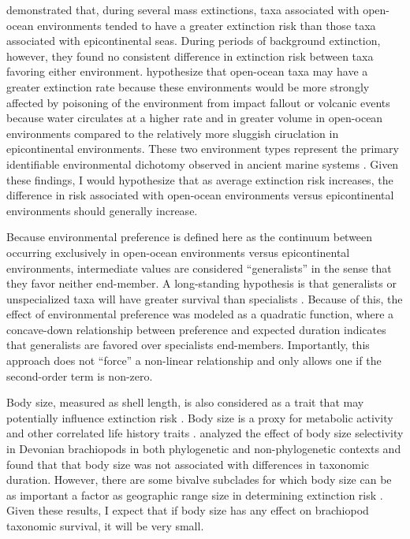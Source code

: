 \documentclass[11pt]{article}
\begin{document}
\citet{Miller2009a} demonstrated that, during several mass extinctions, taxa associated with open-ocean environments tended to have a greater extinction risk than those taxa associated with epicontinental seas. During periods of background extinction, however, they found no consistent difference in extinction risk between taxa favoring either environment. \citet{Miller2009a} hypothesize that open-ocean taxa may have a greater extinction rate because these environments would be more strongly affected by poisoning of the environment from impact fallout or volcanic events because water circulates at a higher rate and in greater volume in open-ocean environments compared to the relatively more sluggish ciruclation in epicontinental environments. These two environment types represent the primary identifiable environmental dichotomy observed in ancient marine systems \citep{Miller2009a,Sheehan2001b}. Given these findings, I would hypothesize that as average extinction risk increases, the difference in risk associated with open-ocean environments versus epicontinental environments should generally increase. 

Because environmental preference is defined here as the continuum between occurring exclusively in open-ocean environments versus epicontinental environments, intermediate values are considered ``generalists'' in the sense that they favor neither end-member. A long-standing hypothesis is that generalists or unspecialized taxa will have greater survival than specialists \citep{Simpson1944,Liow2004a,Liow2007b,Nurnberg2013a,Nurnberg2015,Baumiller1993,Smits2015}. Because of this, the effect of environmental preference was modeled as a quadratic function, where a concave-down relationship between preference and expected duration indicates that generalists are favored over specialists end-members. Importantly, this approach does not ``force'' a non-linear relationship and only allows one if the second-order term is non-zero.

Body size, measured as shell length, is also considered as a trait that may potentially influence extinction risk \citep{Payne2014,Harnik2011}. Body size is a proxy for metabolic activity and other correlated life history traits \citep{Payne2014}. \citet{Harnik2014} analyzed the effect of body size selectivity in Devonian brachiopods in both phylogenetic and non-phylogenetic contexts and found that that body size was not associated with differences in taxonomic duration. However, there are some bivalve subclades for which body size can be as important a factor as geographic range size in determining extinction risk \citep{Harnik2011}. Given these results, I expect that if body size has any effect on brachiopod taxonomic survival, it will be very small.
\end{document}
